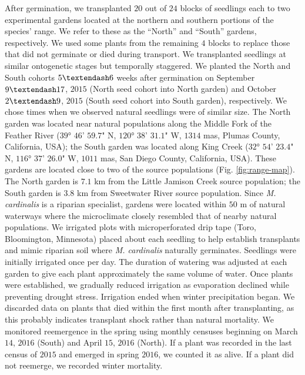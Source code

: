 \documentclass[
  12pt,
]{article}
\begin{document}
After germination, we transplanted \(20\) out of \(24\) blocks of seedlings each to two experimental gardens located at the northern and southern portions of the species' range. We refer to these as the ``North'' and ``South'' gardens, respectively. We used some plants from the remaining \(4\) blocks to replace those that did not germinate or died during transport. We transplanted seedlings at similar ontogenetic stages but temporally staggered. We planted the North and South cohorts \(5 \textendash 6\) weeks after germination on September \(9 \textendash 17\), \(2015\) (North seed cohort into North garden) and October \(2 \textendash 9\), \(2015\) (South seed cohort into South garden), respectively. We chose times when we observed natural seedlings were of similar size. The North garden was located near natural populations along the Middle Fork of the Feather River (\(39\)° \(46\)' \(59.7\)" N, \(120\)° \(38\)' \(31.1\)" W, \(1314\) mas, Plumas County, California, USA); the South garden was located along King Creek (\(32\)° \(54\)' \(23.4\)" N, \(116\)° \(37\)' \(26.0\)" W, \(1011\) mas, San Diego County, California, USA). These gardens are located close to two of the source populations (Fig. \ref{fig:range-map}). The North garden is \(7.1\) km from the Little Jamison Creek source population; the South garden is \(3.8\) km from Sweetwater River source population. Since \textit{M. cardinalis} is a riparian specialist, gardens were located within \(50\) m of natural waterways where the microclimate closely resembled that of nearby natural populations. We irrigated plots with microperforated drip tape (Toro, Bloomington, Minnesota) placed about each seedling to help establish transplants and mimic riparian soil where \textit{M. cardinalis} naturally germinates. Seedlings were initially irrigated once per day. The duration of watering was adjusted at each garden to give each plant approximately the same volume of water. Once plants were established, we gradually reduced irrigation as evaporation declined while preventing drought stress. Irrigation ended when winter precipitation began. We discarded data on plants that died within the first month after transplanting, as this probably indicates transplant shock rather than natural mortality. We monitored reemergence in the spring using monthly censuses beginning on March \(14\), \(2016\) (South) and April \(15\), \(2016\) (North). If a plant was recorded in the last census of \(2015\) and emerged in spring \(2016\), we counted it as alive. If a plant did not reemerge, we recorded winter mortality.
\end{document}
